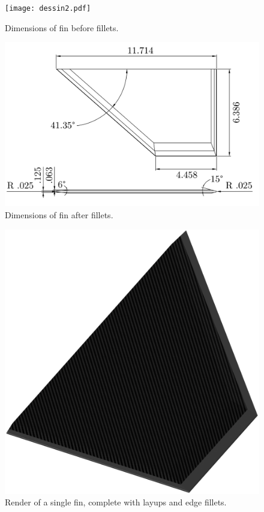 \documentclass{amsdtx}
\begin{document}
\begin{multicols}{2}
\begin{figure}[H]
\centering
\texttt{[image: dessin2.pdf]}	
\caption{Dimensions of fin before fillets.}
\end{figure}
\begin{figure}[H]
\centering
\includegraphics[scale=0.02]{dessin1.pdf}	
\caption{Dimensions of fin after fillets.}
\end{figure}

\end{multicols}
\begin{figure}[H]
\centering
\includegraphics[scale=0.35]{render1.png}	
\caption{Render of a single fin, complete with layups and edge fillets.}
\end{figure}
~\\[1em]
\end{document}
